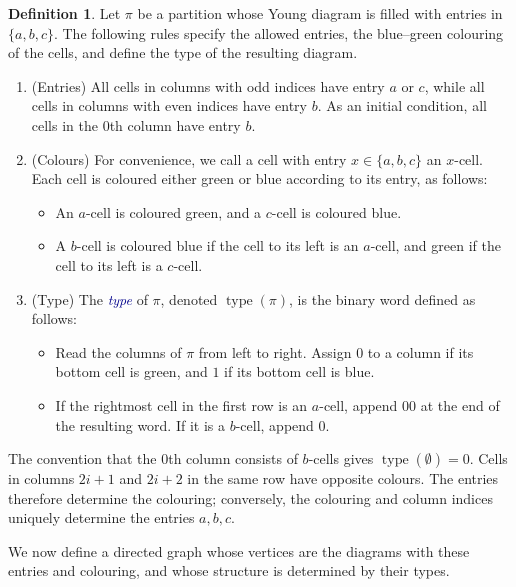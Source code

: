 \documentclass[11pt]{article}
\theoremstyle{definition}
\newtheorem{definition}[theorem]{Definition}
\theoremstyle{remark}
\theoremstyle{definition}
\numberwithin{equation}{section}
\newcommand{\type}{\operatorname{type}}
\renewcommand\emph[1]{\textcolor{darkblue}{\it #1}}
\begin{document}
\begin{definition}\label{def:P2_type}
  Let \( \pi \) be a partition whose Young diagram is filled with
  entries in \(\{a,b,c\}\). The following rules specify the allowed
  entries, the blue--green colouring of the cells, and define the type
  of the resulting diagram.
  \begin{enumerate}
  \item (Entries) All cells in columns with odd indices have entry \( a \)
    or \( c \), while all cells in columns with even indices have entry
    \( b \). As an initial condition, all cells in the \( 0 \)th column
    have entry \( b \).
  \item (Colours) For convenience, we call a cell with entry
    \( x \in \{a,b,c\} \) an \( x \)-cell. Each cell is coloured either
    green or blue according to its entry, as follows:
    \begin{itemize}
    \item An \( a \)-cell is coloured green, and a \( c \)-cell is coloured blue.
    \item A \( b \)-cell is coloured blue if the cell to its left is an \( a \)-cell, and green if the cell to its left is a \( c \)-cell.
    \end{itemize}
  \item (Type) The \emph{type} of \(\pi\), denoted \( \type(\pi) \), is
    the binary word defined as follows:
    \begin{itemize}
    \item Read the columns of \( \pi \) from left to right. Assign \( 0 \)
      to a column if its bottom cell is green, and \( 1 \) if its bottom
      cell is blue.
    \item If the rightmost cell in the first row is an \( a \)-cell,
      append \( 00 \) at the end of the resulting word. If it is a \( b \)-cell,
      append \( 0 \).
    \end{itemize}
  \end{enumerate}
\end{definition}

The convention that the \( 0 \)th column consists of \( b \)-cells
gives \( \type(\emptyset) = 0 \). Cells in columns \( 2i+1 \) and
\( 2i+2 \) in the same row have opposite colours. The entries
therefore determine the colouring; conversely, the colouring and
column indices uniquely determine the entries \( a,b,c \).

We now define a directed graph whose vertices are the diagrams with
these entries and colouring, and whose structure is determined by
their types.
\end{document}
